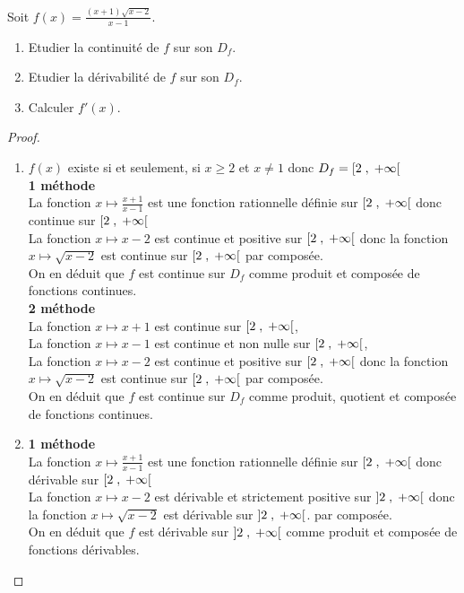 \begin{exercice}
Soit $ f (x)=\frac{(x+1)\sqrt{x-2}}{x-1}.$
 \begin{enumerate}
\item Etudier la continuité  de $ f $ sur son $D_{f}$.
\item Etudier  la dérivabilité de $ f $ sur son $D_{f}$.
\item Calculer $ f'(x). $
\end{enumerate}
\end{exercice}
\begin{proof}
\begin{enumerate}
\item $ f(x) $ existe si et seulement, si $ x \geq 2 $ et  $ x\neq 1 $ donc $ D_{f}=\left[2 \;,\; +\infty\right[ $ \\ \textbf{ 1\iere{} méthode } \\ La fonction $ x \mapsto \frac{x+1}{x-1} $ est une fonction rationnelle définie sur $\left[2 \;,\; +\infty\right[  $ donc continue  sur $\left[2 \;,\; +\infty\right[  $ \\ La fonction $ x \mapsto x-2$ est continue et positive sur $\left[2 \;,\; +\infty\right[  $  donc la fonction $ x \mapsto \sqrt{x-2} $ est continue sur $\left[2 \;,\; +\infty\right[  $  par composée.\\ On en déduit que $ f $ est continue sur $  D_{f}$ comme produit et composée de  fonctions continues. \\
\textbf{ 2\iere{} méthode } \\  La fonction $ x \mapsto x+1 $ est  continue  sur $\left[2 \;,\; +\infty\right[ $, \\ La fonction $ x \mapsto x-1 $ est  continue et non nulle  sur  $\left[2 \;,\; +\infty\right[ $,   \\ La fonction $ x \mapsto x-2$ est continue et positive sur $\left[2 \;,\; +\infty\right[$  donc la fonction $ x \mapsto \sqrt{x-2} $ est continue sur $\left[2 \;,\; +\infty\right[ $  par composée.\\ On en déduit que $ f $ est continue sur $  D_{f}$ comme produit, quotient et composée de  fonctions continues.\\

\item  \textbf{ 1\iere{} méthode } \\ La fonction $ x \mapsto \frac{x+1}{x-1} $ est une fonction rationnelle définie sur $\left[2 \;,\; +\infty\right[  $ donc  dérivable sur $\left[2 \;,\; +\infty\right[  $ \\ La fonction $ x \mapsto x-2$ est dérivable et strictement positive sur $\left]2 \;,\; +\infty\right[$ donc la fonction $ x \mapsto \sqrt{x-2} $ est  dérivable sur $\left]2 \;,\; +\infty\right[$. par composée.\\ On en déduit que $ f $ est dérivable  sur $\left]2 \;,\; +\infty\right[$ comme produit et composée de  fonctions dérivables. \\


\end{enumerate}
\end{proof}
